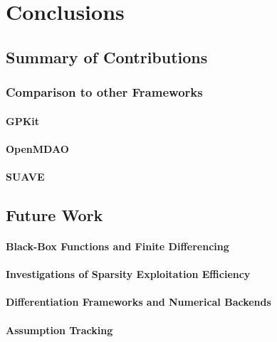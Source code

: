 \chapter{Conclusions}

\section{Summary of Contributions}

\subsection{Comparison to other Frameworks}
\label{sect:compare}

\subsubsection{GPKit}

\subsubsection{OpenMDAO}

\subsubsection{SUAVE}

\section{Future Work}

\subsubsection{Black-Box Functions and Finite Differencing}
\label{sect:future-work-black-box}

\subsubsection{Investigations of Sparsity Exploitation Efficiency}

\subsubsection{Differentiation Frameworks and Numerical Backends}

\subsubsection{Assumption Tracking}

